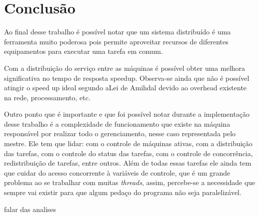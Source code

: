 \documentclass[
	12pt,				%
    oneside,			%
	a4paper,			%
	english,			%
	brazil,				%
	]{abntex2}
\begin{document}
\chapter{Conclusão}

Ao final desse trabalho é possível notar que um sistema distribuído é uma ferramenta muito poderosa pois permite aproveitar recursos de diferentes equipamentos para executar uma tarefa em comum.

Com a distribuição do serviço entre as máquinas é possível obter uma melhora significativa no tempo de resposta speedup. 
Observa-se ainda que não é possível atingir o speed up ideal segundo aLei de Amihdal devido ao overhead existente na rede, processamento, etc.



Outro ponto que é importante e que foi possível notar durante a implementação desse trabalho é a complexidade de funcionamento que existe na máquina responsável por realizar todo o gerenciamento, nesse caso representada pelo mestre. Ele tem que lidar: com o controle de máquinas ativas, com a distribuição das tarefas, com o controle do status das tarefas, com o controle de concorrência, redistribuição de tarefas, entre outros. Além de todas essas tarefas ele ainda tem que cuidar do acesso
concorrente à variáveis de controle, que é um grande problema ao se trabalhar com muitas \textit{threads}, assim, percebe-se a necessidade que sempre vai existir para que algum pedaço do programa não seja paralelizável.


falar das analises



\postextual


\end{document}
